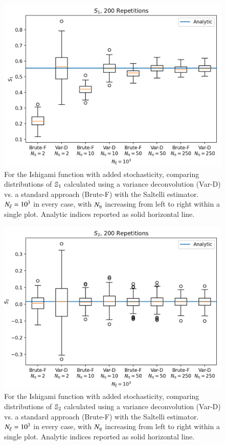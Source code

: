 \begin{figure}[b]
    \centering
    \includegraphics[width=\textwidth]{figures/ishi_s1_boxplot_c5.png}
    \caption{For the Ishigami function with added stochasticity, comparing distributions of $\S{1}$ calculated using a variance deconvolution (Var-D) vs. a standard approach (Brute-F) with the Saltelli estimator. $\Nxi=10^3$ in every case, with $\Neta$ increasing from left to right within a single plot. Analytic indices reported as solid horizontal line.}
    \label{fig:ishigami-s1}
\end{figure} \hfill
\begin{figure}[b]
    \centering
    \includegraphics[width=\textwidth]{figures/ishi_s2_boxplot_c5.png}
    \caption{For the Ishigami function with added stochasticity, comparing distributions of $\S{2}$ calculated using a variance deconvolution (Var-D) vs. a standard approach (Brute-F) with the Saltelli estimator. $\Nxi=10^3$ in every case, with $\Neta$ increasing from left to right within a single plot. Analytic indices reported as solid horizontal line.}
    \label{fig:ishigami-s2}
\end{figure}
